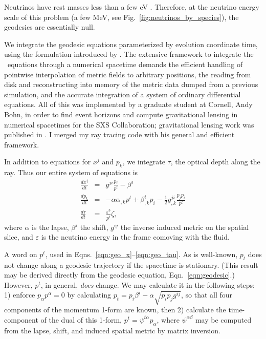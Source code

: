 Neutrinos have rest masses less than a few eV \citep{oliv2014-pdg}.
Therefore, at the neutrino energy scale
of this problem (a few MeV, see Fig.~\ref{fig:neutrinos_by_species}), the
geodesics are essentially null.

We integrate the geodesic equations parameterized by evolution coordinate time,
using the formulation introduced by \cite{hugh1994-eh_finding}.
The extensive framework to integrate the \citeauthor{hugh1994-eh_finding}\
equations through a numerical spacetime demands the efficient handling of
pointwise interpolation of metric fields to arbitrary positions, the reading from
disk and reconstructing into memory of the metric data dumped from a previous
simulation, and the accurate integration of a system of ordinary differential
equations.
All of this was implemented by a graduate student at Cornell, Andy Bohn, in order
to find event horizons and compute gravitational lensing in numerical spacetimes
for the SXS Collaboration;
gravitational lensing work was published in \cite{bohn2015-lensing}.
I merged my ray tracing code with his general and efficient framework.

In addition to equations for $x^j$ and $p_k$, we integrate $\tau$, the optical
depth along the ray. Thus our entire system of equations is
\begin{eqnarray}
  \label{eqn:geo_x}
  \frac{dx^j}{dt} &=& g^{ji}\frac{p_i}{p^t} - \beta^j \\
  \label{eqn:geo_p}
  \frac{dp_k}{dt} &=& -\alpha \alpha_{,k}p^t + \beta^i_{,k}p_i
  - \frac{1}{2}g^{ji}_{,k} \frac{p_jp_i}{p^t} \\
  \label{eqn:geo_tau}
  \frac{d\tau}{dt} &=& \frac{\varepsilon^3}{p^t} \zeta,
\end{eqnarray}
where $\alpha$ is the lapse, $\beta^j$ the shift, $g^{ij}$ the inverse
induced metric on the spatial slice, and $\varepsilon$ is the neutrino
energy in the frame comoving with the fluid.

A word on $p^t$, used in Eqns.~\ref{eqn:geo_x}--\ref{eqn:geo_tau}.
As is well-known, $p_t$ does not change along a geodesic trajectory if the
spacetime is stationary. (This result may be derived directly from the geodesic
equation, Eqn.~\ref{eqn:geodesic}.)
However, $p^t$, in general, \emph{does} change. We may calculate it in the
following steps: 1) enforce $p_\alpha p^\alpha=0$ by calculating
$p_t=p_i\beta^i-\alpha\sqrt{p_ip_jg^{ij}}$, so that all four components of the
momentum 1-form are known, then 2) calculate the time-component of the dual of
this 1-form, $p^t=\psi^{t\alpha}p_\alpha$, where $\psi^{\alpha\beta}$ may be
computed from the lapse, shift, and induced spatial metric by matrix inversion.

